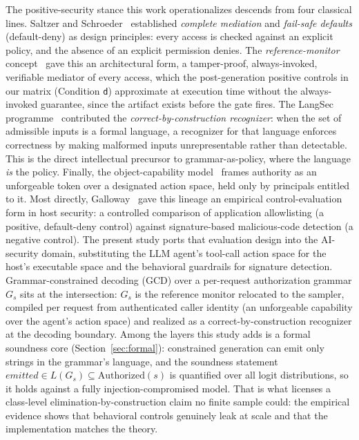 The positive-security stance this work operationalizes descends from four classical lines. Saltzer and Schroeder~\cite{saltzer1975} established \emph{complete mediation} and \emph{fail-safe defaults} (default-deny) as design principles: every access is checked against an explicit policy, and the absence of an explicit permission denies. The \emph{reference-monitor} concept~\cite{anderson1972} gave this an architectural form, a tamper-proof, always-invoked, verifiable mediator of every access, which the post-generation positive controls in our matrix (Condition \texttt{d}) approximate at execution time without the always-invoked guarantee, since the artifact exists before the gate fires. The LangSec programme~\cite{sassaman2013langsec} contributed the \emph{correct-by-construction recognizer}: when the set of admissible inputs is a formal language, a recognizer for that language enforces correctness by making malformed inputs unrepresentable rather than detectable. This is the direct intellectual precursor to grammar-as-policy, where the language \emph{is} the policy. Finally, the object-capability model~\cite{dennisvanhorn1966,miller2006} frames authority as an unforgeable token over a designated action space, held only by principals entitled to it. Most directly, Galloway~\cite{galloway2020} gave this lineage an empirical control-evaluation form in host security: a controlled comparison of application allowlisting (a positive, default-deny control) against signature-based malicious-code detection (a negative control). The present study ports that evaluation design into the AI-security domain, substituting the LLM agent's tool-call action space for the host's executable space and the behavioral guardrails for signature detection. Grammar-constrained decoding (GCD) over a per-request authorization grammar \(G_s\) sits at the intersection: \(G_s\) is the reference monitor relocated to the sampler, compiled per request from authenticated caller identity (an unforgeable capability over the agent's action space) and realized as a correct-by-construction recognizer at the decoding boundary. Among the layers this study adds is a formal soundness core (Section~\ref{sec:formal}): constrained generation can emit only strings in the grammar's language, and the soundness statement \(\textit{emitted} \in L(G_s) \subseteq \mathrm{Authorized}(s)\) is quantified over all logit distributions, so it holds against a fully injection-compromised model. That is what licenses a class-level elimination-by-construction claim no finite sample could: the empirical evidence shows that behavioral controls genuinely leak at scale and that the implementation matches the theory.

